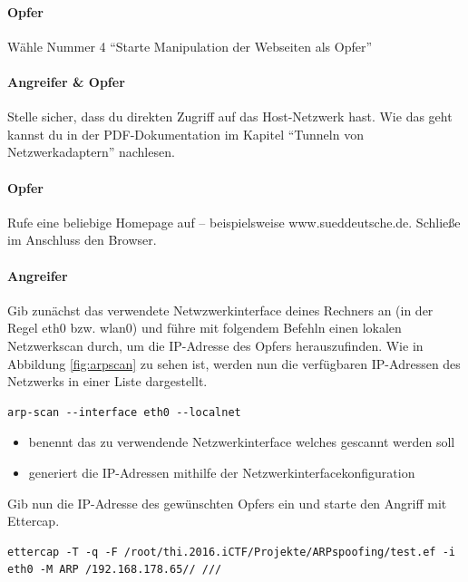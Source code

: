 \paragraph{Opfer} Wähle Nummer 4 \enquote{Starte Manipulation der Webseiten als Opfer}

\paragraph{Angreifer \& Opfer} Stelle sicher, dass du direkten Zugriff auf das Host-Netzwerk hast. Wie das geht kannst du in der PDF-Dokumentation im Kapitel \enquote{Tunneln von Netzwerkadaptern} nachlesen.

\paragraph{Opfer} Rufe eine beliebige Homepage auf -- beispielsweise www.sueddeutsche.de. Schließe im Anschluss den Browser.

\paragraph{Angreifer} Gib zunächst das verwendete Netwzwerkinterface deines Rechners an (in der Regel eth0 bzw. wlan0) und führe mit folgendem Befehln einen lokalen Netzwerkscan durch, um die IP-Adresse des Opfers herauszufinden. Wie in Abbildung \ref{fig:arpscan} zu sehen ist, werden nun die verfügbaren IP-Adressen des Netzwerks in einer Liste dargestellt.
\begin{lstlisting}
arp-scan --interface eth0 --localnet
\end{lstlisting}

\begin{itemize}
	\item {} benennt das zu verwendende Netzwerkinterface welches gescannt werden soll
	\item {} generiert die IP-Adressen mithilfe der Netzwerkinterfacekonfiguration
\end{itemize}

Gib nun die IP-Adresse des gewünschten Opfers ein und starte den Angriff mit Ettercap.
\begin{lstlisting}
ettercap -T -q -F /root/thi.2016.iCTF/Projekte/ARPspoofing/test.ef -i eth0 -M ARP /192.168.178.65// ///
\end{lstlisting}

